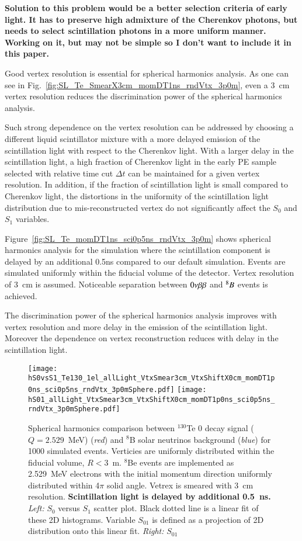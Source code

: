 {\bf Solution to this problem would be a better selection criteria of
  early light. It has to preserve high admixture of the Cherenkov
  photons, but needs to select scintillation photons in a more uniform
  manner. Working on it, but may not be simple so I don't want to
  include it in this paper.}

Good vertex resolution is essential for spherical harmonics analysis. As one can see in Fig.~\ref{fig:SL_Te_SmearX3cm_momDT1ns_rndVtx_3p0m}, even a 3~cm vertex resolution reduces the discrimination power of the spherical harmonics analysis.

Such strong dependence on the vertex resolution can be
addressed by choosing a different liquid scintillator mixture with a
more delayed emission of the scintillation light with respect to the Cherenkov light. With a larger delay in the scintillation light, a high fraction of Cherenkov light in the early PE sample selected with relative time cut $\Delta t$ can be maintained for a given vertex resolution. In addition, if the fraction of scintillation light is small compared to Cherenkov light, the distortions in the uniformity of the scintillation light distribution due to mis-reconstructed vertex do not significantly affect the $S_0$ and $S_1$ variables.

Figure~\ref{fig:SL_Te_momDT1ns_sci0p5ns_rndVtx_3p0m} shows
spherical harmonics analysis for the simulation where the
scintillation component is delayed by an additional 0.5ns compared to our default simulation. Events are simulated uniformly within the fiducial volume of the detector. Vertex resolution of 3~cm is assumed. Noticeable separation between $0\nu\beta\beta$ and $^{8}B$ events is achieved.

The discrimination power of the spherical harmonics analysis improves with vertex resolution and more delay in the emission of the scintillation light. Moreover the dependence on vertex reconstruction reduces with delay in the scintillation light. 

\begin{figure*}[h]
  \centering
  \texttt{[image: hS0vsS1\_Te130\_1el\_allLight\_VtxSmear3cm\_VtxShiftX0cm\_momDT1p0ns\_sci0p5ns\_rndVtx\_3p0mSphere.pdf]}
  \texttt{[image: hS01\_allLight\_VtxSmear3cm\_VtxShiftX0cm\_momDT1p0ns\_sci0p5ns\_rndVtx\_3p0mSphere.pdf]}
  \caption{Spherical harmonics comparison between $^{130}$Te 0{\nbb}
    decay signal ($Q=2.529$~MeV) (\emph{red}) and $^{8}$B solar
    neutrinos background (\emph{blue}) for 1000 simulated
    events. Verticies are uniformly distributed within the fiducial
    volume, $R<3$~m. $^8$Be events are implemented as 2.529~MeV
    electrons with the initial momentum direction uniformly
    distributed within 4$\pi$ solid angle. Vetrex is smeared with 3~cm
    resolution. {\bf Scintillation light is delayed by additional
      0.5~ns.} \emph{Left:} $S_0$ versus $S_1$ scatter plot. Black dotted
    line is a linear fit of these 2D histograms. Variable $S_{01}$ is
    defined as a projection of 2D distribution onto this linear
    fit. \emph{Right:} $S_{01}$}
\label{fig:SL_Te_SmearX3cm_momDT1ns_sci0p5ns_rndVtx_3p0m}
\end{figure*}

